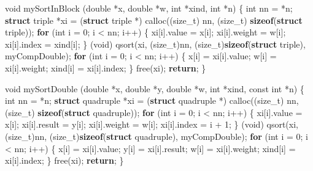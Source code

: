 \documentclass[12pt,]{article}
\newenvironment{Shaded}{\begin{snugshade}}{\end{snugshade}}
\newcommand{\KeywordTok}[1]{\textcolor[rgb]{0.13,0.29,0.53}{\textbf{{#1}}}}
\newcommand{\DataTypeTok}[1]{\textcolor[rgb]{0.13,0.29,0.53}{{#1}}}
\newcommand{\DecValTok}[1]{\textcolor[rgb]{0.00,0.00,0.81}{{#1}}}
\newcommand{\NormalTok}[1]{{#1}}
\begin{document}
\begin{Shaded}
\begin{Highlighting}[]
\DataTypeTok{void} \NormalTok{mySortInBlock (}\DataTypeTok{double} \NormalTok{*x, }\DataTypeTok{double} \NormalTok{*w, }\DataTypeTok{int} \NormalTok{*xind, }\DataTypeTok{int} \NormalTok{*n) \{}
    \DataTypeTok{int} \NormalTok{nn = *n;}
    \KeywordTok{struct} \NormalTok{triple *xi =}
        \NormalTok{(}\KeywordTok{struct} \NormalTok{triple *) calloc((size_t) nn, (size_t) }\KeywordTok{sizeof}\NormalTok{(}\KeywordTok{struct} \NormalTok{triple));}
    \KeywordTok{for} \NormalTok{(}\DataTypeTok{int} \NormalTok{i = }\DecValTok{0}\NormalTok{; i < nn; i++) \{}
        \NormalTok{xi[i].value = x[i];}
        \NormalTok{xi[i].weight = w[i];}
        \NormalTok{xi[i].index = xind[i];}
    \NormalTok{\}}
    \NormalTok{(}\DataTypeTok{void}\NormalTok{) qsort(xi, (size_t)nn, (size_t)}\KeywordTok{sizeof}\NormalTok{(}\KeywordTok{struct} \NormalTok{triple), myCompDouble);}
    \KeywordTok{for} \NormalTok{(}\DataTypeTok{int} \NormalTok{i = }\DecValTok{0}\NormalTok{; i < nn; i++) \{}
        \NormalTok{x[i] = xi[i].value;}
        \NormalTok{w[i] = xi[i].weight;}
        \NormalTok{xind[i] = xi[i].index;}
    \NormalTok{\}}
    \NormalTok{free(xi);}
    \KeywordTok{return}\NormalTok{;}
\NormalTok{\}}


\DataTypeTok{void} \NormalTok{mySortDouble (}\DataTypeTok{double} \NormalTok{*x, }\DataTypeTok{double} \NormalTok{*y, }\DataTypeTok{double} \NormalTok{*w, }\DataTypeTok{int} \NormalTok{*xind, }\DataTypeTok{const} \DataTypeTok{int} \NormalTok{*n) \{}
    \DataTypeTok{int} \NormalTok{nn = *n;}
    \KeywordTok{struct} \NormalTok{quadruple *xi =}
        \NormalTok{(}\KeywordTok{struct} \NormalTok{quadruple *) calloc((size_t) nn, (size_t) }\KeywordTok{sizeof}\NormalTok{(}\KeywordTok{struct} \NormalTok{quadruple));}
    \KeywordTok{for} \NormalTok{(}\DataTypeTok{int} \NormalTok{i = }\DecValTok{0}\NormalTok{; i < nn; i++) \{}
        \NormalTok{xi[i].value = x[i];}
        \NormalTok{xi[i].result = y[i];}
        \NormalTok{xi[i].weight = w[i];}
        \NormalTok{xi[i].index = i + }\DecValTok{1}\NormalTok{;}
    \NormalTok{\}}
    \NormalTok{(}\DataTypeTok{void}\NormalTok{) qsort(xi, (size_t)nn, (size_t)}\KeywordTok{sizeof}\NormalTok{(}\KeywordTok{struct} \NormalTok{quadruple), myCompDouble);}
    \KeywordTok{for} \NormalTok{(}\DataTypeTok{int} \NormalTok{i = }\DecValTok{0}\NormalTok{; i < nn; i++) \{}
        \NormalTok{x[i] = xi[i].value;}
        \NormalTok{y[i] = xi[i].result;}
        \NormalTok{w[i] = xi[i].weight;}
        \NormalTok{xind[i] = xi[i].index;}
    \NormalTok{\}}
    \NormalTok{free(xi);}
    \KeywordTok{return}\NormalTok{;}
\NormalTok{\}}


\end{Highlighting}
\end{Shaded}
\end{document}
